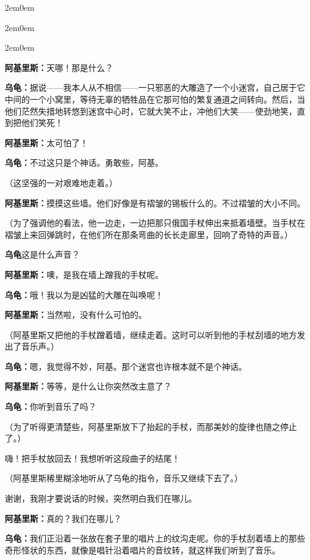 \documentclass[
  12pt,
  twoside,
  openright,
  oldfontcommands,
]{memoir}
\newcommand{\dialogname}[1]{{\heifamily\bfseries #1}}
\begin{document}
\begin{adjustwidth}{2em}{0em}

\begin{adjustwidth}{2em}{0em}

\begin{adjustwidth}{2em}{0em}

\dialogname{阿基里斯：}天哪！那是什么？

\dialogname{乌龟：}据说------我本人从不相信------一只邪恶的大雕造了一个小迷宫，自己居于它中间的一个小窝里，等待无辜的牺牲品在它那可怕的繁复通道之间转向。然后，当他们茫然失措地转悠到迷宫中心时，它就大笑不止，冲他们大笑------使劲地笑，直到把他们笑死！

\dialogname{阿基里斯：}太可怕了！

\dialogname{乌龟：}不过这只是个神话。勇敢些，阿基。

（这坚强的一对艰难地走着。）

\dialogname{阿基里斯：}摸摸这些墙。他们好像是有褶皱的锡板什么的。不过褶皱的大小不同。

（为了强调他的看法，他一边走，一边把那只俄国手杖伸出来抵着墙壁。当手杖在褶皱上来回弹跳时，在他们所在那条弯曲的长长走廊里，回响了奇特的声音。）

\dialogname{乌龟}这是什么声音？

\dialogname{阿基里斯：}噢，是我在墙上蹭我的手杖呢。

\dialogname{乌龟：}哦！我以为是凶猛的大雕在叫唤呢！

\dialogname{阿基里斯：}当然啦，没有什么可怕的。

（阿基里斯又把他的手杖蹭着墙，继续走着。这时可以听到他的手杖刮墙的地方发出了音乐声。）

\dialogname{乌龟：}嗯，我觉得不妙，阿基。那个迷宫也许根本就不是个神话。

\dialogname{阿基里斯：}等等，是什么让你突然改主意了？

\dialogname{乌龟：}你听到音乐了吗？

（为了听得更清楚些，阿基里斯放下了抬起的手杖，而那美妙的旋律也随之停止了。）

嗨！把手杖放回去！我想听听这段曲子的结尾！

（阿基里斯稀里糊涂地听从了乌龟的指令，音乐又继续下去了。）

谢谢，我刚才要说话的时候，突然明白我们在哪儿。

\dialogname{阿基里斯：}真的？我们在哪儿？

\dialogname{乌龟：}我们正沿着一张放在套子里的唱片上的纹沟走呢。你的手杖刮着墙上的那些奇形怪状的东西，就像是唱针沿着唱片的音纹转，就这样我们听到了音乐。


\end{adjustwidth}
\end{adjustwidth}
\end{adjustwidth}
\end{document}
